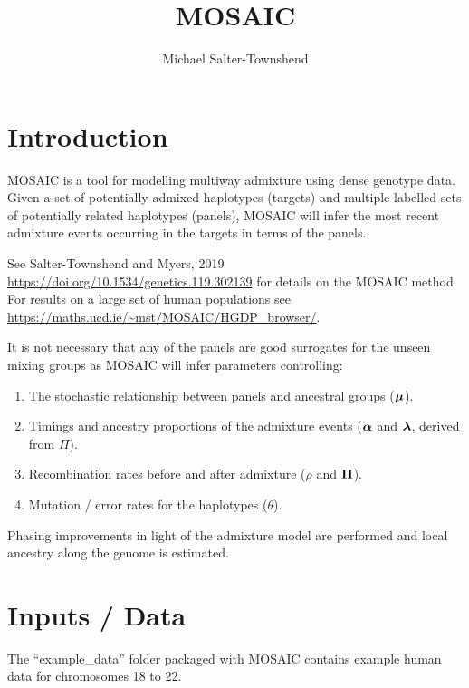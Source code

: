 \documentclass{article}
\begin{document}
\newcommand{\Fst}{\textrm{F}_{\textrm{st}}}
\newcommand{\hFst}{\hat F_{\textrm{st}}}
\newcommand{\Rst}{\textrm{R}_{\textrm{st}}}
\newcommand{\bm}[1]{\mbox{\boldmath $ #1 $}}

\title{MOSAIC}
\author{Michael Salter-Townshend}

\maketitle

\section{Introduction}
MOSAIC is a tool for modelling multiway admixture using dense genotype data. 
Given a set of potentially admixed haplotypes (targets) and multiple labelled sets of potentially related haplotypes (panels), 
MOSAIC will infer the most recent admixture events occurring in the targets in terms of the panels.

See Salter-Townshend and Myers, 2019 \url{https://doi.org/10.1534/genetics.119.302139} 
for details on the MOSAIC method. 
For results on a large set of human populations see \url{https://maths.ucd.ie/~mst/MOSAIC/HGDP_browser/}. 

It is not necessary that any of the panels are good surrogates for the unseen mixing groups as MOSAIC will infer parameters controlling:
\begin{enumerate}
  \item The stochastic relationship between panels and ancestral groups ($\bm\mu$). 
  \item Timings and ancestry proportions of the admixture events ($\bm\alpha$ and $\bm\lambda$, derived from $\Pi$). 
  \item Recombination rates before and after admixture ($\rho$ and $\bm\Pi$). 
  \item Mutation / error rates for the haplotypes ($\theta$).
\end{enumerate}

Phasing improvements in light of the admixture model are performed and local ancestry along the genome is estimated.

\section{Inputs / Data}
The ``example\_data'' folder packaged with MOSAIC contains example human data for chromosomes 18 to 22.
\end{document}
